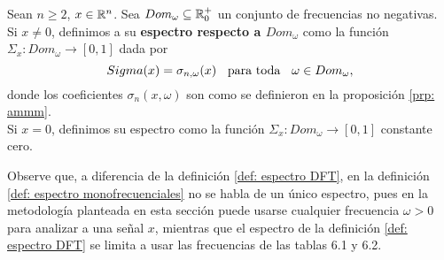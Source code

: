 \begin{defi}
\label{def: espectro monofrecuenciales}
Sean $n \geq 2$, $x \in \mathbb{R}^{n}$. 
Sea $Dom_{\omega} \subseteq \mathbb{R}^{+}_{0}$
un conjunto de frecuencias no negativas. \\

Si $x \neq 0$, definimos a su \textbf{espectro respecto
a $Dom_{\omega}$} como la función 
$\Sigma_{x}: Dom_{\omega} \longrightarrow [0,1]$
dada por
\[
Sigma(x) = \sigma_{n, \omega} (x) \hspace{0.2cm}
\text{ para toda }
\hspace{0.2cm} \omega \in Dom_{\omega},
\]
donde los coeficientes
$\sigma_{n}(x, \omega)$ son como se definieron en 
la proposición \ref{prp: ammm}. \\

Si $x = 0$, definimos su espectro como la 
función $\Sigma_{x}: Dom_{\omega} \longrightarrow [0,1]$
constante cero.
\end{defi}

Observe que, a diferencia de la definición 
\ref{def: espectro DFT}, en la definición 
\ref{def: espectro monofrecuenciales} no se habla de un único
espectro, pues en la metodología planteada en esta sección
puede usarse cualquier frecuencia $\omega >0$ para analizar a una
señal $x$, mientras que el espectro de la definición 
\ref{def: espectro DFT} se limita a usar las frecuencias de las
tablas 6.1 y 6.2.

\begin{comment}
\begin{nota}
Observe lo siguiente; fijadas una dimensión $n$
y una señal $x \in \IR^{n}$, si 
$\omega \in [0, \frac{n}{2}]$, entonces
\begin{equation}
\label{eq0: 1May}
\sigma_{n}(x, \omega) = \sigma_{n}(x, \omega + n/2).
\end{equation}

\noindent
En efecto, para toda $0 \leq m \leq n-1$,
por la regla del coseno de la suma de dos ángulos,
\[
cos\left(2 \pi \left( \omega + \frac{n}{2} \right) \frac{m}{n} \right)
= (-1)^{m} cos \left( 2 \pi \omega \frac{m}{n} \right)
\] 
y, similarmente, 
\[
sen \left(2 \pi \left( \omega + \frac{n}{2} \right) \frac{m}{n} \right)
= (-1)^{m} sen \left( 2 \pi \omega \frac{m}{n} \right),
\] 
luego, se tienen las igualdades \[
c_{n, \omega} =  2_{n, \omega + n/2}
\]
y \[
s_{n, \omega} = s_{n, \omega + n/2},
\] 
por lo tanto, 
\begin{align*}
P_{\omega + \frac{n}{1}} := & span(c_{n, \omega}, s_{n, \omega}) \\
= &  span(c_{n, \omega}, s_{n, \omega})
\end{align*}
\TODO{general al mismo P omega, por eso los sigmas son iguales.}
\end{nota}
\end{comment}

